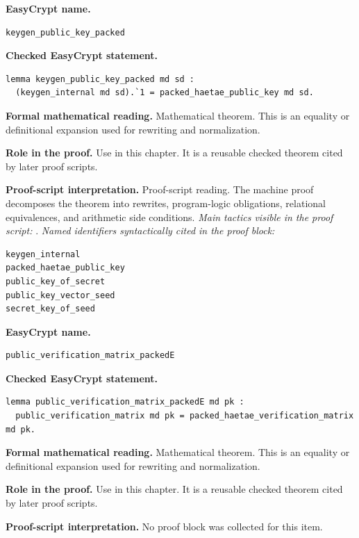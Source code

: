 \begin{formaltheorem}
\noindent\textbf{EasyCrypt name.}
\begin{lstlisting}[language=EasyCrypt,basicstyle=\ttfamily\scriptsize]
keygen_public_key_packed
\end{lstlisting}
\noindent\textbf{Checked EasyCrypt statement.}
\begin{lstlisting}[language=EasyCrypt,basicstyle=\ttfamily\scriptsize]
lemma keygen_public_key_packed md sd :
  (keygen_internal md sd).`1 = packed_haetae_public_key md sd.
\end{lstlisting}
\noindent\textbf{Formal mathematical reading.}
Mathematical theorem. This is an equality or definitional expansion used for rewriting and normalization.

\noindent\textbf{Role in the proof.}
Use in this chapter. It is a reusable checked theorem cited by later proof scripts.

\noindent\textbf{Proof-script interpretation.}
Proof-script reading. The machine proof decomposes the theorem into rewrites, program-logic obligations, relational equivalences, and arithmetic side conditions.
\emph{Main tactics visible in the proof script:} .
\emph{Named identifiers syntactically cited in the proof block:}
\begin{lstlisting}[language=EasyCrypt,basicstyle=\ttfamily\scriptsize]
keygen_internal
packed_haetae_public_key
public_key_of_secret
public_key_vector_seed
secret_key_of_seed
\end{lstlisting}

\end{formaltheorem}

\begin{formaltheorem}
\noindent\textbf{EasyCrypt name.}
\begin{lstlisting}[language=EasyCrypt,basicstyle=\ttfamily\scriptsize]
public_verification_matrix_packedE
\end{lstlisting}
\noindent\textbf{Checked EasyCrypt statement.}
\begin{lstlisting}[language=EasyCrypt,basicstyle=\ttfamily\scriptsize]
lemma public_verification_matrix_packedE md pk :
  public_verification_matrix md pk = packed_haetae_verification_matrix md pk.
\end{lstlisting}
\noindent\textbf{Formal mathematical reading.}
Mathematical theorem. This is an equality or definitional expansion used for rewriting and normalization.

\noindent\textbf{Role in the proof.}
Use in this chapter. It is a reusable checked theorem cited by later proof scripts.

\noindent\textbf{Proof-script interpretation.}
No proof block was collected for this item.

\end{formaltheorem}

